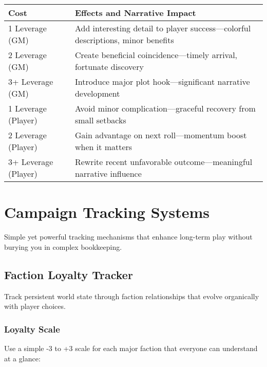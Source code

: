 \begin{fatebox}
\begin{tabularx}{\textwidth}{lX}
\toprule
\textbf{Cost} & \textbf{Effects and Narrative Impact} \\
\midrule
1 Leverage (GM) & Add interesting detail to player success---colorful descriptions, minor benefits \\
2 Leverage (GM) & Create beneficial coincidence---timely arrival, fortunate discovery \\
3+ Leverage (GM) & Introduce major plot hook---significant narrative development \\
1 Leverage (Player) & Avoid minor complication---graceful recovery from small setbacks \\
2 Leverage (Player) & Gain advantage on next roll---momentum boost when it matters \\
3+ Leverage (Player) & Rewrite recent unfavorable outcome---meaningful narrative influence \\
\bottomrule
\end{tabularx}
\end{fatebox}

\section*{Campaign Tracking Systems}

Simple yet powerful tracking mechanisms that enhance long-term play without burying you in complex bookkeeping.

\subsection*{Faction Loyalty Tracker}

Track persistent world state through faction relationships that evolve organically with player choices.

\subsubsection*{Loyalty Scale}

Use a simple -3 to +3 scale for each major faction that everyone can understand at a glance:

